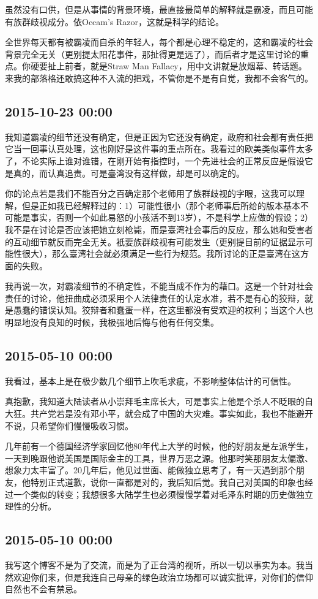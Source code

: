 \documentclass[twocolumn]{ctexart}
\begin{document}
虽然没有口供，但是从事情的背景环境，最直接最简单的解释就是霸凌，而且可能有族群歧视成分。依Occam's Razor，这就是科学的结论。

全世界每天都有被霸凌而自杀的年轻人，每个都是心理不稳定的，这和霸凌的社会背景完全无关（更别提太阳花事件，那扯得更是远了），而后者才是这里讨论的重点。你硬要扯上前者，就是Straw Man Fallacy，用中文讲就是放烟幕、转话题。来我的部落格还敢搞这种不入流的把戏，不管你是不是有自觉，我都不会客气的。\subsection*{2015-10-23 00:00}
我知道霸凌的细节还没有确定，但是正因为它还没有确定，政府和社会都有责任把它当一回事认真处理，这也刚好是这件事的重点所在。我看过的欧美类似事件太多了，不论实际上谁对谁错，在刚开始有指控时，一个先进社会的正常反应是假设它是真的，而认真追责。可是臺湾没有这样做，却是可以确定的。

你的论点若是我们不能百分之百确定那个老师用了族群歧视的字眼，这我可以理解，但是正如我已经解释过的：1）可能性很小（那个老师事后所给的版本基本不可能是事实，否则一个如此易怒的小孩活不到13岁），不是科学上应做的假设；2）我不是在讨论是否应该把她立刻枪毙，而是臺湾社会事后的反应，那么她和受害者的互动细节就反而完全无关。衹要族群歧视有可能发生（更别提目前的证据显示可能性很大），那么臺湾社会就必须满足一些行为规范。我所讨论的正是臺湾在这方面的失败。

我再说一次，对霸凌细节的不确定性，不能当成不作为的藉口。这是一个针对社会责任的讨论，他扭曲成必须采用个人法律责任的认定水准，若不是有心的狡辩，就是愚蠢的错误认知。狡辩者和蠢蛋一样，在这里都没有受欢迎的权利；当这个人也明显地没有良知的时候，我极强地后悔与他有任何交集。\subsection*{2015-05-10 00:00}
我看过，基本上是在极少数几个细节上吹毛求疵，不影响整体估计的可信性。

真抱歉，我知道大陆读者从小崇拜毛主席长大，可是事实上他是个杀人不眨眼的自大狂。共产党若是没有邓小平，就会成了中国的大灾难。事实如此，我也不能避开不说，只希望你们慢慢吸收习惯。

几年前有一个德国经济学家回忆他80年代上大学的时候，他的好朋友是左派学生，一天到晚跟他说美国是国际金主的工具，世界万恶之源。他那时笑那朋友太偏激、想象力太丰富了。20几年后，他见过世面、能做独立思考了，有一天遇到那个朋友，他特别正式道歉，说你一直都是对的，我后知后觉。我自己对美国的印象也经过一个类似的转变；我想很多大陆学生也必须慢慢学着对毛泽东时期的历史做独立理性的分析。\subsection*{2015-05-10 00:00}
我写这个博客不是为了交流，而是为了正台湾的视听，所以一切以事实为本。我当然欢迎你们来，但是我连自己母亲的绿色政治立场都可以诚实批评，对你们的信仰自然也不会有禁忌。
\end{document}
